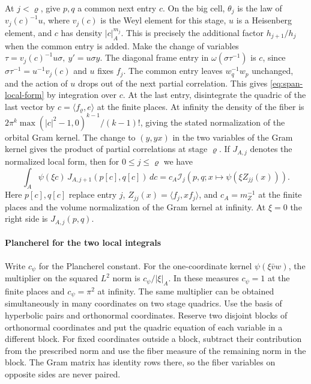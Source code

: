 At \(j<\varrho\), give \(p,q\) a common next entry \(c\). On the big
cell, \(\theta_j\) is the law of \(v_j(c)^{-1}u\), where \(v_j(c)\) is the
Weyl element for this stage, \(u\) is a Heisenberg element, and \(c\) has
density \(|c|_A^{m_j}\). This is precisely the additional factor
\(h_{j+1}/h_j\) when the common entry is added. Make the change of
variables \(\tau=v_j(c)^{-1}u\sigma,\ y'=u\sigma y\).
The diagonal frame entry in \(\omega(\sigma\tau^{-1})\) is \(c\), since
\(\sigma\tau^{-1}=u^{-1}v_j(c)\) and \(u\) fixes \(f_j\). The common
entry leaves \(w_q^{-1}w_p\) unchanged, and the action of \(u\) drops out
of the next partial correlation. This gives \eqref{eq:span-local-form}
by integration over \(c\). At the last entry, disintegrate the quadric
of the last vector by \(c=\langle f_\varrho,e\rangle\) at the finite
places. At infinity the density of the fiber is
\(2\pi^k\max(|c|^2-1,0)^{k-1}/(k-1)!\), giving the stated normalization
of the orbital Gram kernel. The change to \((y,yx)\) in the two
variables of the Gram kernel gives the product of partial correlations
at stage \(\varrho\). If \(J_{A,j}\) denotes the normalized local form,
then for \(0\le j\le\varrho\) we have
\begin{equation}\label{eq:span-local-descent}
 \int_A\psi(\xi c)\,J_{A,j+1}(p[c],q[c])\,dc
   =c_A\mathcal I_j(p,q;x\mapsto\psi(\xi Z_{jj}(x))).
\end{equation}
Here \(p[c],q[c]\) replace entry \(j\), \(Z_{jj}(x)=\langle f_j,xf_j\rangle\),
and \(c_A=m_Z^{-1}\) at the finite places and the volume normalization of
the Gram kernel at infinity. At \(\xi=0\) the right side is
\(J_{A,j}(p,q)\).

\paragraph{Plancherel for the two local integrals}\label{par:span-local-plancherel}
Write \(c_\psi\) for the Plancherel constant. For the one-coordinate
kernel \(\psi(\xi\bar v w)\), the multiplier on the squared \(L^2\) norm
is \(c_\psi/|\xi|_A\). In these measures \(c_\psi=1\) at the finite places
and \(c_\psi=\pi^2\) at infinity. The same multiplier can be obtained
simultaneously in many coordinates on two stage quadrics. Use the
basis of hyperbolic pairs and orthonormal coordinates. Reserve two
disjoint blocks of orthonormal coordinates and put the quadric equation
of each variable in a different block. For fixed coordinates outside
a block, subtract their contribution from the prescribed norm and
use the fiber measure of the remaining norm in the block. The Gram
matrix has identity rows there, so the fiber variables on opposite
sides are never paired.

